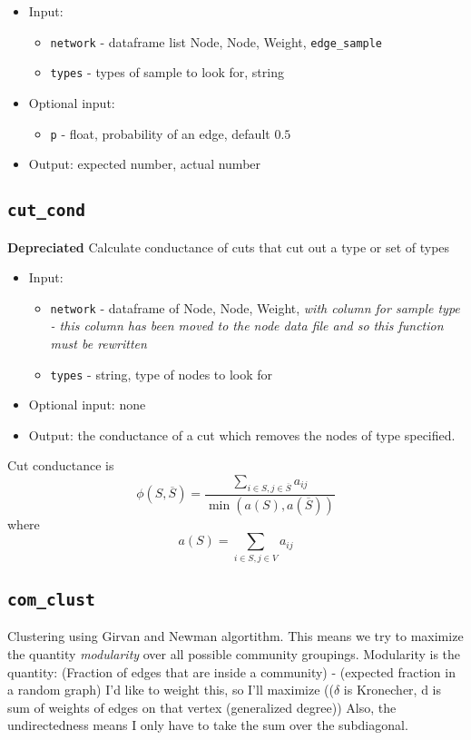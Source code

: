 \documentclass[10pt]{article}
\theoremstyle{definition}
\numberwithin{theorem}{section}
\numberwithin{definition}{section}
\numberwithin{lemma}{section}
\numberwithin{corollary}{section}
\numberwithin{clm}{section}
\numberwithin{rmk}{section}
\newcommand{\ol}{\overline}
\begin{document}
\begin{itemize}
	\item Input: 
\begin{itemize}
	\item \verb|network| - dataframe list Node, Node, Weight, \verb|edge_sample|
	\item \verb|types| - types of sample to look for, string
\end{itemize}
\item Optional input: 
\begin{itemize}
	\item 	\verb|p| - float, probability of an edge, default $0.5$
\end{itemize}
	\item Output: expected number, actual number
\end{itemize}

\cprotect \subsection{\verb|cut_cond|}
{\bf Depreciated}
Calculate conductance of cuts that cut out a type or set of types
\begin{itemize}
	\item Input: 
	\begin{itemize}
		\item \verb|network| - dataframe of Node, Node, Weight, \emph{with column for sample type - this column has been moved to the node data file and so this function must be rewritten}
		\item \verb|types| - string, type of nodes to look for
	\end{itemize}
	\item Optional input: none
	\item Output: the conductance of a cut which removes the nodes of type specified.
\end{itemize}

Cut conductance \cite{dgraph_theory} is 
\[
\phi(S,\ol{S}) = \frac{\sum_{i\in S, j\in \ol{S}}a_{ij}}{\min(a(S), a(\ol{S}))}
\]
where
\[
a(S) = \sum_{i\in S, j\in V} a_{ij}
\]

\cprotect \subsection{\verb|com_clust|}
Clustering using Girvan and Newman algortithm. This means we try to maximize the 
quantity \emph{modularity} over all possible community groupings. Modularity is
the quantity: (Fraction of edges that are inside a community) - (expected fraction in a random graph)
I'd like to weight this, so I'll maximize
(($\delta$ is Kronecher, d is sum of weights of edges on that vertex (generalized degree))
Also, the undirectedness means I only have to take the sum over the subdiagonal.
\end{document}
